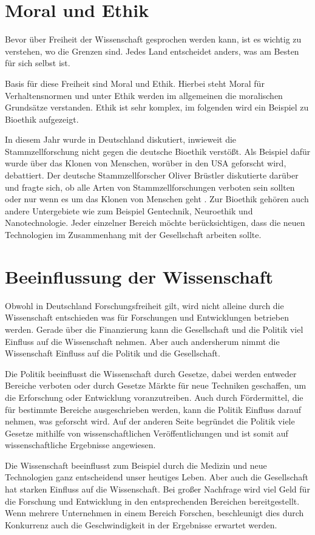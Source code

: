 \documentclass{pmwk}
\begin{document}
\nocite{01,02,03,04,05,06,DeuFunk,forschfoerd,fiff,gvw}


\Abgabeblatt{}{}{}{}




\section*{Moral und Ethik}
Bevor über Freiheit der Wissenschaft gesprochen werden kann, ist es wichtig zu verstehen, wo die Grenzen sind. Jedes Land entscheidet anders, was am Besten für sich selbst ist. \par
Basis für diese Freiheit sind Moral und Ethik. Hierbei steht Moral für Verhaltensnormen und unter Ethik werden im allgemeinen die moralischen Grundsätze verstanden. Ethik ist sehr komplex, im folgenden wird ein Beispiel zu Bioethik aufgezeigt. \par
In diesem Jahr wurde in Deutschland diskutiert, inwieweit die Stammzellforschung nicht gegen die deutsche Bioethik verstößt. Als Beispiel dafür wurde über das Klonen von Menschen, worüber in den USA geforscht wird, debattiert. Der deutsche Stammzellforscher Oliver Brüstler diskutierte darüber und fragte sich, ob alle Arten von Stammzellforschungen verboten sein sollten oder nur wenn es um das Klonen von Menschen geht \cite{Bruestle}. Zur Bioethik gehören auch andere Untergebiete wie zum Beispiel Gentechnik, Neuroethik und Nanotechnologie. Jeder einzelner Bereich möchte berücksichtigen, dass die neuen Technologien im Zusammenhang mit der Gesellschaft arbeiten sollte.  \cite{bpb} \par
 
\section*{Beeinflussung der Wissenschaft}
Obwohl in Deutschland Forschungsfreiheit gilt, wird nicht alleine durch die Wissenschaft entschieden was für Forschungen und Entwicklungen betrieben werden. Gerade über die Finanzierung kann die Gesellschaft und die Politik viel Einfluss auf die Wissenschaft nehmen. Aber auch andersherum nimmt die Wissenschaft Einfluss auf die Politik und die Gesellschaft. \par
Die Politik beeinflusst die Wissenschaft durch Gesetze, dabei werden entweder Bereiche verboten oder durch Gesetze Märkte für neue Techniken geschaffen, um die Erforschung oder Entwicklung voranzutreiben. Auch durch Fördermittel, die für bestimmte Bereiche ausgeschrieben werden, kann die Politik Einfluss darauf nehmen, was geforscht wird. Auf der anderen Seite begründet die Politik viele Gesetze mithilfe von wissenschaftlichen Veröffentlichungen und ist somit auf wissenschaftliche Ergebnisse angewiesen. \par
Die Wissenschaft beeinflusst zum Beispiel durch die Medizin und neue Technologien ganz entscheidend unser heutiges Leben. Aber auch die Gesellschaft hat starken Einfluss auf die Wissenschaft. Bei großer Nachfrage wird viel Geld für die Forschung und Entwicklung in den entsprechenden Bereichen bereitgestellt. Wenn mehrere Unternehmen in einem Bereich Forschen, beschleunigt dies durch Konkurrenz auch die Geschwindigkeit in der Ergebnisse erwartet werden. 
\end{document}
